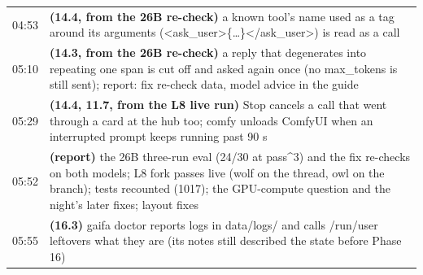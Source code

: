 \begin{longtable}{@{}l>{\raggedright\arraybackslash}p{14.2cm}@{}}
04:53 & \textbf{(14.4, from the 26B re-check)} a known tool's name used as a tag around its arguments (<ask\_user>\{\ldots{}\}</ask\_user>) is read as a call \\
05:10 & \textbf{(14.3, from the 26B re-check)} a reply that degenerates into repeating one span is cut off and asked again once (no max\_tokens is still sent); report: fix re-check data, model advice in the guide \\
05:29 & \textbf{(14.4, 11.7, from the L8 live run)} Stop cancels a call that went through a card at the hub too; comfy unloads ComfyUI when an interrupted prompt keeps running past 90 s \\
05:52 & \textbf{(report)} the 26B three-run eval (24/30 at pass\textasciicircum{}3) and the fix re-checks on both models; L8 fork passes live (wolf on the thread, owl on the branch); tests recounted (1017); the GPU-compute question and the night's later fixes; layout fixes \\
05:55 & \textbf{(16.3)} gaifa doctor reports logs in data/logs/ and calls /run/user leftovers what they are (its notes still described the state before Phase 16) \\
\bottomrule
\end{longtable}
